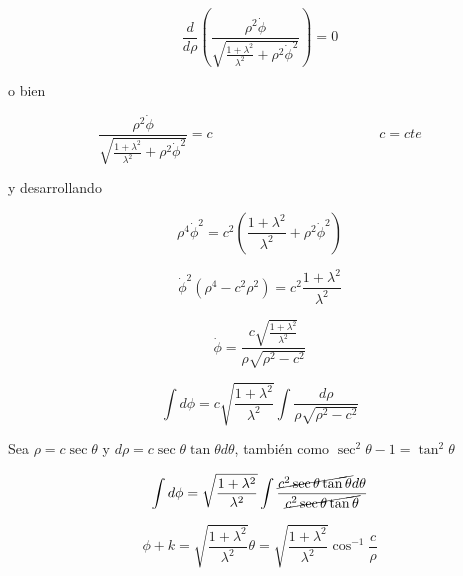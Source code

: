\documentclass[12pt,a4paper]{article}
\begin{document}
\begin{enumerate}
        \begin{equation*}
            \frac{d}{d\rho} \left( \frac{\rho^2 \dot{\phi}}{\sqrt{ \frac{1 + \lambda^2}{\lambda^2} + \rho^2 \dot{\phi}^2}} \right) = 0
        \end{equation*}
        
        o bien
        
        \begin{equation*}
            \frac{\rho^2 \dot{\phi}}{\sqrt{ \frac{1 + \lambda^2}{\lambda^2} + \rho^2 \dot{\phi}^2}} = c  \hspace{5cm} c = cte
        \end{equation*}
        
        y desarrollando
        
        \begin{equation*}
            \rho^4 \dot{\phi}^2 = c^2\left( \frac{1 + \lambda^2}{\lambda^2} + \rho^2 \dot{\phi}^2\right)
        \end{equation*}
        
        \begin{equation*}
            \dot{\phi}^2(\rho^4 -c^2 \rho^2) = c^2 \frac{1 + \lambda^2}{\lambda^2} 
        \end{equation*}
        
        
        \begin{equation*}
            \dot{{\phi}} = \frac{c \sqrt{\frac{1 + \lambda^2}{\lambda^2}} }{\rho\sqrt{\rho^2 -c^2}}
        \end{equation*}
        
        \begin{equation*}
            \int d\phi =c \sqrt{\frac{1 + \lambda^2}{\lambda^2}} \int  \frac{d\rho }{\rho\sqrt{\rho^2 -c^2}}
        \end{equation*}
        
        Sea $\rho = c \sec{\theta}$ y $d \rho = c \sec{\theta} \tan{\theta} d \theta$, también como $\sec^2{\theta} - 1 = \tan^2{\theta}$
        
        \begin{equation*}
            \int d\phi = \sqrt{\frac{1 + \lambda^2}{\lambda^2}} \int  \frac{\cancel{c^2 \sec{\theta} \tan{\theta}} d\theta}{\cancel{c^2 \sec{\theta}\tan{\theta}
            }}
        \end{equation*}
        
        \begin{equation*}
            \phi + k = \sqrt{\frac{1 + \lambda^2}{\lambda^2}} \theta=   \sqrt{\frac{1 + \lambda^2}{\lambda^2}} \cos^{-1}{\frac{c}{\rho}}
        \end{equation*}
        

\end{enumerate}
\end{document}
